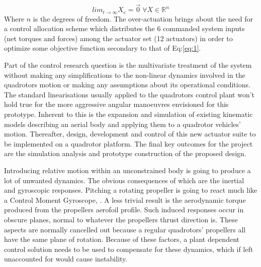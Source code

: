 \begin{equation} \label{eq:1}
lim_{t \rightarrow \infty} X_e = \vec{0}\;\forall X \in \mathbb{R}^n
\end{equation}
Where $n$ is the degrees of freedom. The over-actuation brings about the need for a control allocation scheme which distributes the 6 commanded system inputs (net torques and forces) among the actuator set (12 actuators) in order to optimize some objective function secondary to that of Eq:\ref{eq:1}.
\par
Part of the control research question is the multivariate treatment of the system without making any simplifications to the non-linear dynamics involved in the quadrotors motion or making any assumptions about its operational conditions. The standard linearisations usually applied to the quadrotors control plant won't hold true for the more aggressive angular manoeuvres envisioned for this prototype. Inherent to this is the expansion and simulation of existing kinematic models describing an aerial body and applying them to a quadrotor vehicles' motion. Thereafter, design, development and control of this new actuator suite to be implemented on a quadrotor platform. The final key outcomes for the project are the simulation analysis and prototype construction of the proposed design.
\par
Introducing relative motion within an unconstrained body is going to produce a lot of unwanted dynamics. The obvious consequences of which are the inertial and gyroscopic responses. Pitching a rotating propeller is going to react much like a Control Moment Gyroscope, \cite{cmg}. A less trivial result is the aerodynamic torque produced from the propellers aerofoil profile. Such induced responses occur in obscure planes, normal to whatever the propellers thrust direction is. These aspects are normally cancelled out because a regular quadrotors' propellers all have the same plane of rotation. Because of these factors, a plant dependent control solution needs to be used to compensate for these dynamics, which if left unaccounted for would cause instability. 
